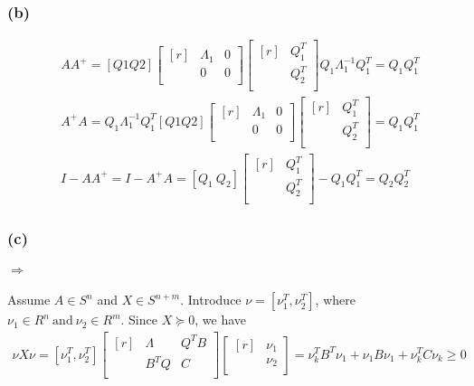 \subsubsection*{(b)}
\begin{align*}
&AA^+ = [Q1 Q2]\begin{bmatrix*}[r]
&\Lambda_1 &0 \\&0 &0\\
\end{bmatrix*}\begin{bmatrix*}[r]
&Q^T_1 \\&Q^T_2 \\
\end{bmatrix*}Q_1\Lambda^{-1}_1Q_1^T = Q_1Q_1^T \\
&A^+A =Q_1\Lambda^{-1}_1Q_1^T[Q1 Q2]\begin{bmatrix*}[r]
&\Lambda_1 &0 \\&0 &0\\
\end{bmatrix*}\begin{bmatrix*}[r]
&Q^T_1 \\&Q^T_2 \\
\end{bmatrix*} =  Q_1Q_1^T
\end{align*}
\begin{align*}
I- AA^+ = I-A^+A = [Q_1\ Q_2]\begin{bmatrix*}[r]
&Q^T_1 \\&Q^T_2 \\
\end{bmatrix*} -  Q_1Q_1^T = Q_2Q_2^T
\end{align*}
\subsubsection*{(c)}
\paragraph{}
$\Rightarrow$
\paragraph{}
Assume $A \in S^n$ and $X \in S^{n+m}$. Introduce $\nu =  [\nu_1^T, \nu_2^T]$, where $\nu_1 \in R^n\ \text{and}\ \nu_2 \in R^m$. Since $X \succeq 0$, we have
\begin{align*}
\nu X\nu =[\nu_1^T, \nu_2^T]\begin{bmatrix*}[r]
& \Lambda & Q^TB\\&B^TQ &C\\
\end{bmatrix*}\begin{bmatrix*}[r]
&\nu_1 \\&\nu_2\\ 
\end{bmatrix*}= \nu_k^TB^T\nu_1 + \nu_1B\nu_1 +\nu_k^TC\nu_k \geq 0
\end{align*}
